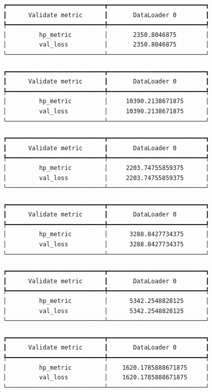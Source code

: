 \documentclass[
  letterpaper,
  DIV=11,
  numbers=noendperiod]{scrreprt}
\begin{document}
\begin{verbatim}
┏━━━━━━━━━━━━━━━━━━━━━━━━━━━┳━━━━━━━━━━━━━━━━━━━━━━━━━━━┓
┃      Validate metric      ┃       DataLoader 0        ┃
┡━━━━━━━━━━━━━━━━━━━━━━━━━━━╇━━━━━━━━━━━━━━━━━━━━━━━━━━━┩
│         hp_metric         │       2350.8046875        │
│         val_loss          │       2350.8046875        │
└───────────────────────────┴───────────────────────────┘
\end{verbatim}

\begin{verbatim}
┏━━━━━━━━━━━━━━━━━━━━━━━━━━━┳━━━━━━━━━━━━━━━━━━━━━━━━━━━┓
┃      Validate metric      ┃       DataLoader 0        ┃
┡━━━━━━━━━━━━━━━━━━━━━━━━━━━╇━━━━━━━━━━━━━━━━━━━━━━━━━━━┩
│         hp_metric         │     10390.2138671875      │
│         val_loss          │     10390.2138671875      │
└───────────────────────────┴───────────────────────────┘
\end{verbatim}

\begin{verbatim}
┏━━━━━━━━━━━━━━━━━━━━━━━━━━━┳━━━━━━━━━━━━━━━━━━━━━━━━━━━┓
┃      Validate metric      ┃       DataLoader 0        ┃
┡━━━━━━━━━━━━━━━━━━━━━━━━━━━╇━━━━━━━━━━━━━━━━━━━━━━━━━━━┩
│         hp_metric         │     2203.74755859375      │
│         val_loss          │     2203.74755859375      │
└───────────────────────────┴───────────────────────────┘
\end{verbatim}

\begin{verbatim}
┏━━━━━━━━━━━━━━━━━━━━━━━━━━━┳━━━━━━━━━━━━━━━━━━━━━━━━━━━┓
┃      Validate metric      ┃       DataLoader 0        ┃
┡━━━━━━━━━━━━━━━━━━━━━━━━━━━╇━━━━━━━━━━━━━━━━━━━━━━━━━━━┩
│         hp_metric         │      3288.8427734375      │
│         val_loss          │      3288.8427734375      │
└───────────────────────────┴───────────────────────────┘
\end{verbatim}

\begin{verbatim}
┏━━━━━━━━━━━━━━━━━━━━━━━━━━━┳━━━━━━━━━━━━━━━━━━━━━━━━━━━┓
┃      Validate metric      ┃       DataLoader 0        ┃
┡━━━━━━━━━━━━━━━━━━━━━━━━━━━╇━━━━━━━━━━━━━━━━━━━━━━━━━━━┩
│         hp_metric         │      5342.2548828125      │
│         val_loss          │      5342.2548828125      │
└───────────────────────────┴───────────────────────────┘
\end{verbatim}

\begin{verbatim}
┏━━━━━━━━━━━━━━━━━━━━━━━━━━━┳━━━━━━━━━━━━━━━━━━━━━━━━━━━┓
┃      Validate metric      ┃       DataLoader 0        ┃
┡━━━━━━━━━━━━━━━━━━━━━━━━━━━╇━━━━━━━━━━━━━━━━━━━━━━━━━━━┩
│         hp_metric         │    1620.1785888671875     │
│         val_loss          │    1620.1785888671875     │
└───────────────────────────┴───────────────────────────┘
\end{verbatim}
\end{document}
